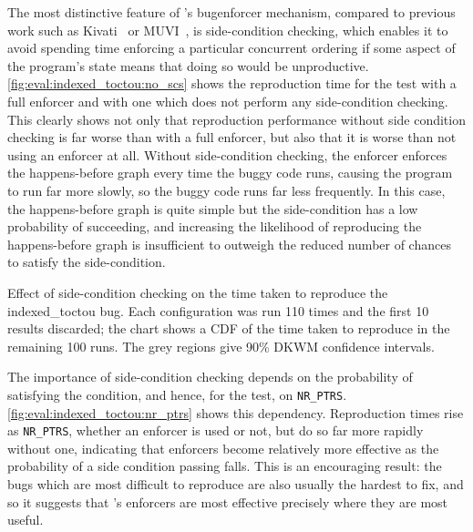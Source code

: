 The most distinctive feature of {\technique}'s \gls{bugenforcer}
mechanism, compared to previous work such as Kivati~\cite{Chew2010} or
MUVI~\cite{Lu2007}, is side-condition checking, which enables it to
avoid spending time enforcing a particular concurrent ordering if some
aspect of the program's state means that doing so would be
unproductive.  \autoref{fig:eval:indexed_toctou:no_scs} shows the
reproduction time for the  test with a full enforcer
and with one which does not perform any side-condition checking.  This
clearly shows not only that reproduction performance without side
condition checking is far worse than with a full enforcer, but also
that it is worse than not using an enforcer at all.  Without
side-condition checking, the enforcer enforces the happens-before
graph every time the buggy code runs, causing the program to run far
more slowly, so the buggy code runs far less frequently.  In this
case, the happens-before graph is quite simple but the side-condition
has a low probability of succeeding, and increasing the likelihood of
reproducing the happens-before graph is insufficient to outweigh the
reduced number of chances to satisfy the
side-condition.

\begin{sanefig}
  \caption{Effect of side-condition checking on the time taken to
    reproduce the indexed\_toctou bug.  Each configuration was run 110
    times and the first 10 results discarded; the chart shows a CDF of
    the time taken to reproduce in the remaining 100 runs.  The grey
    regions give 90\% DKWM confidence intervals.}
  \label{fig:eval:indexed_toctou:no_scs}
\end{sanefig}

The importance of side-condition checking depends on the probability
of satisfying the condition, and hence, for the  test,
on \texttt{NR\_PTRS}.  \autoref{fig:eval:indexed_toctou:nr_ptrs} shows
this dependency.  Reproduction times rise as \texttt{NR\_PTRS},
whether an enforcer is used or not, but do so far more rapidly without
one, indicating that {\technique} enforcers become relatively more
effective as the probability of a side condition passing falls.  This
is an encouraging result: the bugs which are most difficult to
reproduce are also usually the hardest to fix, and so it suggests that
{\technique}'s enforcers are most effective precisely where they are
most useful.

